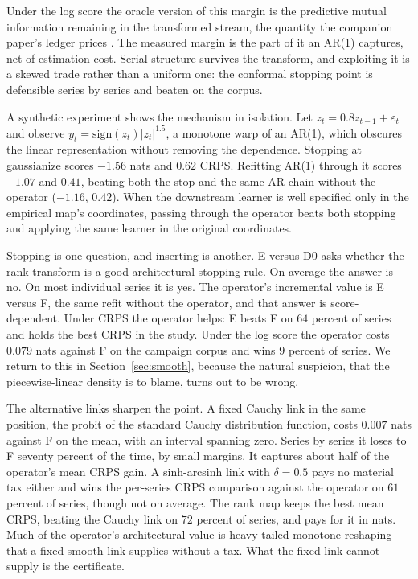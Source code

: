 \documentclass[11pt]{article}
\theoremstyle{remark}
\begin{document}
Under the log score the oracle version of this
margin is the predictive mutual information remaining in the transformed stream, the
quantity the companion paper's ledger prices \citep{cotton2026gap}. The measured margin
is the part of it an AR(1) captures, net of estimation cost. Serial structure survives
the transform, and exploiting it is a skewed trade rather than a uniform one: the
conformal stopping point is defensible series by series and beaten on the corpus.

A synthetic experiment shows the mechanism in isolation. Let $z_t = 0.8 z_{t-1} +
\varepsilon_t$ and observe $y_t = \mathrm{sign}(z_t) |z_t|^{1.5}$, a monotone warp of an
AR(1), which obscures the linear representation without removing the dependence. Stopping at
gaussianize scores $-1.56$ nats and $0.62$ CRPS. Refitting AR(1) through it scores $-1.07$
and $0.41$, beating both the stop and the same AR chain without the operator ($-1.16$,
$0.42$). When the downstream learner is well specified only in the empirical map's
coordinates, passing through the operator beats both stopping and applying the same
learner in the original coordinates.

Stopping is one question, and inserting is another. E versus D0 asks whether the
rank transform is a good architectural stopping rule. On average the answer is no. On
most individual series it is yes. The
operator's incremental value is E versus F, the same refit without the operator, and
that answer is score-dependent. Under CRPS
the operator helps: E beats F on $64$ percent of series and holds the best CRPS in the
study. Under the log score the operator costs $0.079$ nats against F on the campaign
corpus and wins $9$ percent of series. We return to this in
Section~\ref{sec:smooth}, because the natural suspicion, that the piecewise-linear density
is to blame, turns out to be wrong.

The alternative links sharpen the point. A fixed Cauchy link in the same position, the
probit of the standard Cauchy distribution function, costs $0.007$ nats against F on
the mean, with an interval spanning zero. Series by series it loses to F seventy
percent of the time, by small margins. It captures about half of the operator's mean
CRPS gain. A sinh-arcsinh link with $\delta = 0.5$ pays no
material tax either and wins the per-series CRPS comparison against the operator on
$61$ percent of series, though not on average. The rank map keeps the best mean CRPS,
beating the Cauchy link on $72$ percent of series, and pays for it in nats. Much of the
operator's architectural value is heavy-tailed monotone reshaping that a fixed smooth
link supplies without a tax. What the fixed link cannot supply is the certificate.
\end{document}
